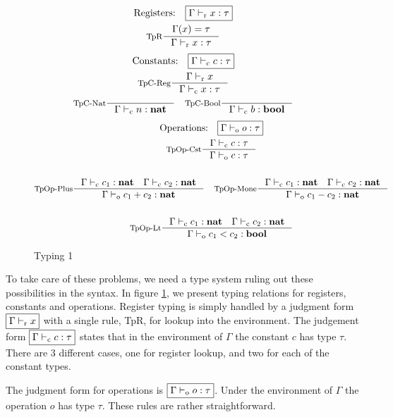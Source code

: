 \documentclass[a4paper, oneside, 10pt, draft]{memoir}
\begin{document}
\begin{figure}
  \begin{gather*}
    \text{Registers:} \quad \boxed{\Gamma \tpr x : \tau}\\
    \inference[TpR]{\Gamma(x) = \tau}{\Gamma \tpr x : \tau}
  \end{gather*}
  \begin{gather*}
    \text{Constants:} \quad \boxed{\Gamma \tpc c : \tau}\\
    \inference[TpC-Reg]{\Gamma \tpr x}{\Gamma \tpc x : \tau}\\
    \inference[TpC-Nat]{}{\Gamma \tpc n : \tnat} \quad
    \inference[TpC-Bool]{}{\Gamma \tpc b : \tbool}
  \end{gather*}
  \begin{gather*}
    \text{Operations:} \quad \boxed{\Gamma \tpop o : \tau} \\
    \inference[TpOp-Cst]{\Gamma \tpc c : \tau}{\Gamma \tpop c : \tau}\\\\
    \inference[TpOp-Plus]{\Gamma \tpc c_1 : \tnat \quad \Gamma
      \tpc c_2 : \tnat}{\Gamma \tpop c_1 + c_2 : \tnat} \quad
    \inference[TpOp-Mone]{\Gamma \tpc c_1 : \tnat \quad \Gamma
      \tpc c_2 : \tnat}{\Gamma \tpop c_1 - c_2 : \tnat}\\\\
    \inference[TpOp-Lt]{\Gamma \tpc c_1 : \tnat \quad \Gamma
      \tpc c_2 : \tnat}{\Gamma \tpop c_1 < c_2 : \tbool}
  \end{gather*}
  \caption{Typing 1}
  \label{fig:type-judgement-1}
\end{figure}

To take care of these problems, we need a type system ruling out these
possibilities in the syntax. In figure \ref{fig:type-judgement-1}, we
present typing relations for registers, constants and
operations. Register typing is simply handled by a judgment form
$\boxed{\Gamma |-_{\mathrm{r}} x}$ with a single rule, TpR, for lookup into the
environment. The judgement form $\boxed{\Gamma |-_{\mathrm{c}} c : \tau}$ states
that in the environment of $\Gamma$ the constant $c$ has type
$\tau$. There are 3 different cases, one for register lookup, and two
for each of the constant types.

The judgment form for operations is $\boxed{\Gamma |-_{\mathrm{o}} o :
  \tau}$. Under the environment of $\Gamma$ the operation $o$ has
type $\tau$. These rules are rather straightforward.
\end{document}

